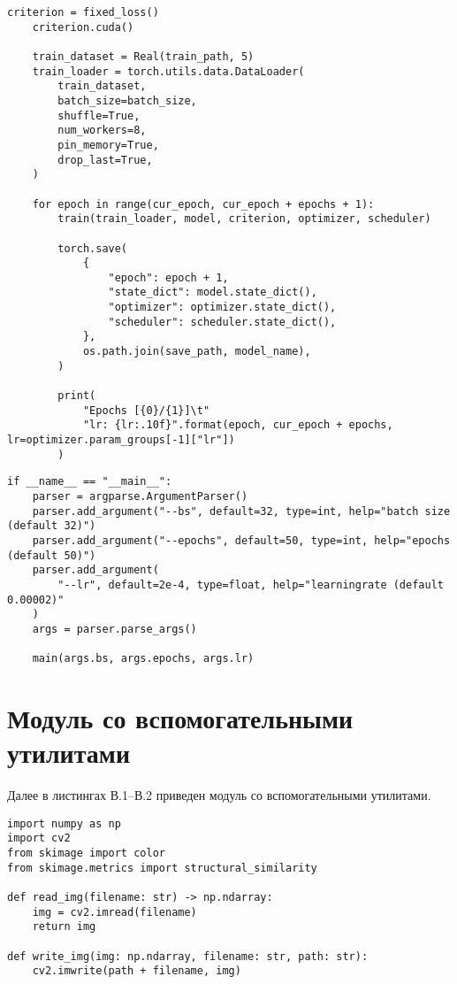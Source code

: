 \begin{appendices}
\begin{lstlisting}[caption={Модуль обучения нейронной сети (часть 2)}]
    criterion = fixed_loss()
    criterion.cuda()

    train_dataset = Real(train_path, 5)
    train_loader = torch.utils.data.DataLoader(
        train_dataset,
        batch_size=batch_size,
        shuffle=True,
        num_workers=8,
        pin_memory=True,
        drop_last=True,
    )

    for epoch in range(cur_epoch, cur_epoch + epochs + 1):
        train(train_loader, model, criterion, optimizer, scheduler)

        torch.save(
            {
                "epoch": epoch + 1,
                "state_dict": model.state_dict(),
                "optimizer": optimizer.state_dict(),
                "scheduler": scheduler.state_dict(),
            },
            os.path.join(save_path, model_name),
        )

        print(
            "Epochs [{0}/{1}]\t"
            "lr: {lr:.10f}".format(epoch, cur_epoch + epochs, lr=optimizer.param_groups[-1]["lr"])
        )
\end{lstlisting}
\clearpage

\begin{lstlisting}[caption={Модуль обучения нейронной сети (часть 3)}]
if __name__ == "__main__":
    parser = argparse.ArgumentParser()
    parser.add_argument("--bs", default=32, type=int, help="batch size (default 32)")
    parser.add_argument("--epochs", default=50, type=int, help="epochs (default 50)")
    parser.add_argument(
        "--lr", default=2e-4, type=float, help="learningrate (default 0.00002)"
    )
    args = parser.parse_args()

    main(args.bs, args.epochs, args.lr)
\end{lstlisting}
\clearpage

\chapter{Модуль со вспомогательными утилитами}

Далее в листингах В.1--В.2 приведен модуль со вспомогательными утилитами. 

\begin{lstlisting}[caption={Модуль со вспомогательными утилитами (часть 1)}]
import numpy as np
import cv2
from skimage import color
from skimage.metrics import structural_similarity

def read_img(filename: str) -> np.ndarray:
    img = cv2.imread(filename)
    return img

def write_img(img: np.ndarray, filename: str, path: str):
    cv2.imwrite(path + filename, img)


\end{lstlisting}
\end{appendices}
